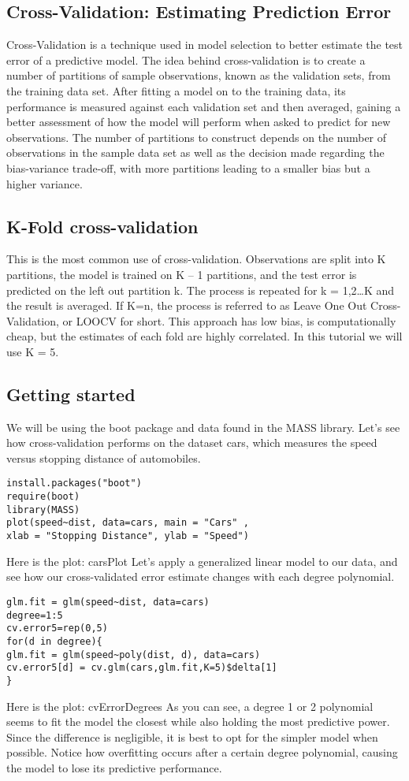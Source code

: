 \subsection*{Cross-Validation: Estimating Prediction Error}
Cross-Validation is a technique used in model selection to better estimate the test error of a predictive model. The idea behind cross-validation is to create a number of partitions of sample observations, known as the validation sets, from the training data set. After fitting a model on to the training data, its performance is measured against each validation set and then averaged, gaining a better assessment of how the model will perform when asked to predict for new observations. The number of partitions to construct depends on the number of observations in the sample data set as well as the decision made regarding the bias-variance trade-off, with more partitions leading to a smaller bias but a higher variance.
\subsection*{K-Fold cross-validation}
This is the most common use of cross-validation. Observations are split into K partitions, the model is trained on K – 1 partitions, and the test error is predicted on the left out partition k. The process is repeated for k = 1,2…K and the result is averaged. If K=n, the process is referred to as Leave One Out Cross-Validation, or LOOCV for short. This approach has low bias, is computationally cheap, but the estimates of each fold are highly correlated. In this tutorial we will use K = 5.
\subsection*{Getting started}
We will be using the boot package and data found in the MASS library. Let’s see how cross-validation performs on the dataset cars, which measures the speed versus stopping distance of automobiles.
\begin{framed}
\begin{verbatim}
install.packages("boot")
require(boot)
library(MASS)
plot(speed~dist, data=cars, main = "Cars" ,
xlab = "Stopping Distance", ylab = "Speed")
\end{verbatim}
\end{framed}
Here is the plot:
carsPlot
Let’s apply a generalized linear model to our data, and see how our cross-validated error estimate changes with each degree polynomial.
\begin{framed}
\begin{verbatim}
glm.fit = glm(speed~dist, data=cars)
degree=1:5
cv.error5=rep(0,5)
for(d in degree){
glm.fit = glm(speed~poly(dist, d), data=cars)
cv.error5[d] = cv.glm(cars,glm.fit,K=5)$delta[1]
}
\end{verbatim}
\end{framed}
Here is the plot:
cvErrorDegrees
As you can see, a degree 1 or 2 polynomial seems to fit the model the closest while also holding the most predictive power. Since the difference is negligible, it is best to opt for the simpler model when possible. Notice how overfitting occurs after a certain degree polynomial, causing the model to lose its predictive performance.
